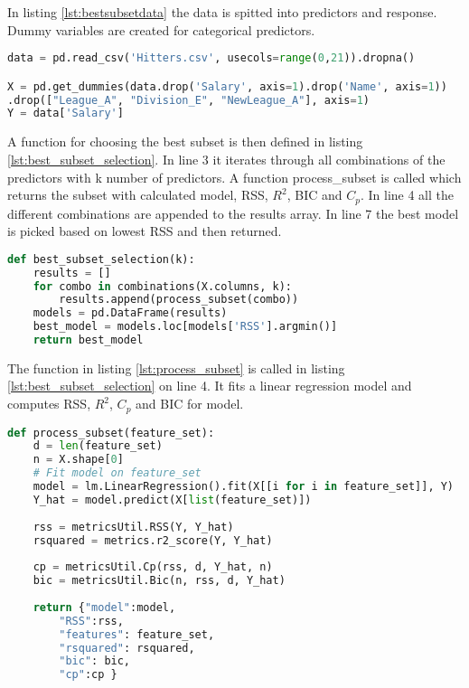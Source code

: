 In listing \ref{lst:bestsubsetdata} the data is spitted into predictors and response. Dummy variables are created for categorical predictors.

\begin{lstlisting}[language=Python, label=lst:bestsubsetdata, caption=Data is split into predictors and response]
data = pd.read_csv('Hitters.csv', usecols=range(0,21)).dropna()

X = pd.get_dummies(data.drop('Salary', axis=1).drop('Name', axis=1))
.drop(["League_A", "Division_E", "NewLeague_A"], axis=1)
Y = data['Salary']
\end{lstlisting}


A function for choosing the best subset is then defined in listing \ref{lst:best_subset_selection}. In line 3 it iterates through all combinations of the predictors with k number of predictors. A function process\_subset is called which returns the subset with calculated model, RSS, $R^2$, BIC and $C_p$. In line 4 all the different combinations are appended to the results array. In line 7 the best model is picked based on lowest RSS and then returned.

\begin{lstlisting}[language=Python, label=lst:best_subset_selection, caption=Function for choosing best subset]
def best_subset_selection(k):
	results = []
	for combo in combinations(X.columns, k):
		results.append(process_subset(combo))
	models = pd.DataFrame(results)
	best_model = models.loc[models['RSS'].argmin()]
	return best_model
\end{lstlisting}

The function in listing \ref{lst:process_subset} is called in listing \ref{lst:best_subset_selection} on line 4. It fits a linear regression model and computes RSS, $R^2$, $C_p$ and BIC for model.

\begin{lstlisting}[language=Python, label=lst:process_subset, caption=Function for computing metrics for subset]
def process_subset(feature_set):
	d = len(feature_set)
	n = X.shape[0]
	# Fit model on feature_set  
	model = lm.LinearRegression().fit(X[[i for i in feature_set]], Y)
	Y_hat = model.predict(X[list(feature_set)])
	
	rss = metricsUtil.RSS(Y, Y_hat)  
	rsquared = metrics.r2_score(Y, Y_hat)
	
	cp = metricsUtil.Cp(rss, d, Y_hat, n)
	bic = metricsUtil.Bic(n, rss, d, Y_hat)
	
	return {"model":model, 
		"RSS":rss,
		"features": feature_set,
		"rsquared": rsquared,
		"bic": bic,
		"cp":cp }
\end{lstlisting}

